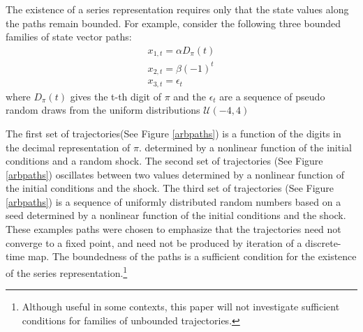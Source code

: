 \documentclass[12pt]{article}
\begin{document}
The existence of a series 
representation requires only that the state values along the 
paths remain bounded.  For example, consider the following three
bounded families of state vector paths:
\begin{gather}
  x_{1,t}=\alpha D_\pi(t) \\
x_{2,t}=\beta (-1)^t\\
x_{3,t}=\epsilon_t 
\end{gather} 
where $D_\pi(t)$ gives the t-th digit of $\pi$ and the $\epsilon_t$ are a sequence of pseudo random draws from the uniform distributions $\mathcal{U}(-4,4)$

The first set of trajectories(See Figure \ref{arbpaths}) is a function of
the digits in the decimal representation of $\pi$.  
determined by a nonlinear function of the initial conditions and a random shock.
The second set of trajectories (See Figure \ref{arbpaths}) oscillates between two values
determined by  a nonlinear function of the initial conditions and the shock.
The third set of trajectories (See Figure \ref{arbpaths}) is a sequence of uniformly distributed random
numbers based on a seed determined by  a nonlinear function of  the initial conditions and the shock.
These examples paths were chosen to emphasize that the trajectories
 need not converge to a fixed point, and 
need not be produced by iteration of a discrete-time map.
The boundedness of the paths is a sufficient condition for the existence 
of the series representation.\footnote{Although useful in some contexts,
this paper will not investigate sufficient conditions for families of
unbounded trajectories.}
\end{document}
